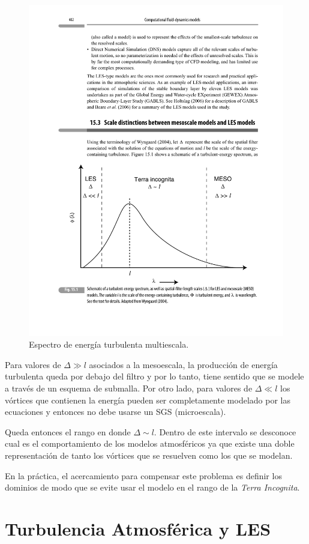 \begin{figure}[H]
	\centering
	\includegraphics[width=0.8\linewidth,trim={2cm 3.0cm 1.5cm 11.5cm},clip]{Imagenes/terra}
	\caption{Espectro de energía turbulenta multiescala.}
	\label{fig:terra}
\end{figure}

Para valores de $\Delta\gg l$ asociados a la mesoescala, la producción de energía turbulenta queda por debajo del filtro y por lo tanto, tiene sentido que se modele a través de un esquema de submalla. Por otro lado, para valores de $\Delta\ll l$ los vórtices que contienen la energía pueden ser completamente modelado por las ecuaciones y entonces no debe usarse un SGS (microescala).

Queda entonces el rango en donde $\Delta\sim l$. Dentro de este intervalo se desconoce cual es el comportamiento de los modelos atmosféricos ya que existe una doble representación de tanto los vórtices que se resuelven como los que se modelan.

En la práctica, el acercamiento para compensar este problema es definir los dominios de modo que se evite usar el modelo en el rango de la \emph{Terra Incognita}.
\section{Turbulencia Atmosférica y LES}
